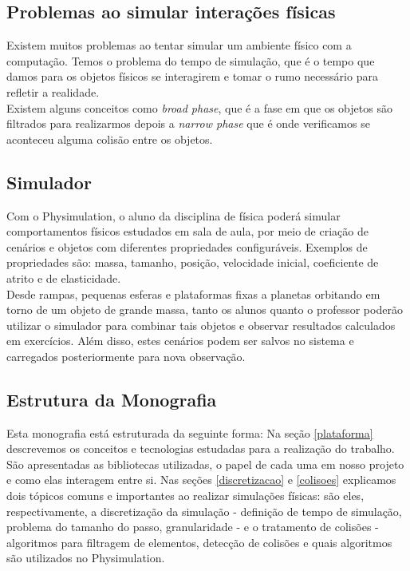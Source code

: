 \subsection{Problemas ao simular interações físicas}
Existem muitos problemas ao tentar simular um ambiente físico com a computação. Temos o problema do tempo de simulação, 
que é o tempo que damos para os objetos físicos se interagirem e tomar o rumo necessário para refletir a realidade. \\

Existem alguns conceitos como \textit{broad phase}, que é a fase em que os objetos são filtrados para realizarmos depois a \textit{narrow phase} que é onde verificamos se aconteceu alguma colisão entre os objetos.

\subsection{Simulador}
Com o Physimulation, o aluno da disciplina de física poderá simular comportamentos físicos estudados em sala de aula, por meio de criação de cenários e objetos com diferentes propriedades configuráveis. Exemplos de propriedades são: massa, tamanho, posição, velocidade inicial, coeficiente de atrito e de elasticidade. \\

Desde rampas, pequenas esferas e plataformas fixas a planetas orbitando em torno de um objeto de grande massa, tanto os alunos quanto o professor poderão utilizar o simulador para combinar tais objetos e observar resultados calculados em exercícios. Além disso, estes cenários podem ser salvos no sistema e carregados posteriormente para nova observação.

\subsection{Estrutura da Monografia}
Esta monografia está estruturada da seguinte forma: Na seção \ref{plataforma} descrevemos os conceitos e tecnologias estudadas para a realização do trabalho. São apresentadas as bibliotecas utilizadas, o papel de cada uma em nosso projeto e como elas interagem entre si. Nas seções \ref{discretizacao} e \ref{colisoes} explicamos dois tópicos comuns e importantes ao realizar simulações físicas: são eles, respectivamente, a discretização da simulação - definição de tempo de simulação, problema do tamanho do passo, granularidade - e o tratamento de colisões - algoritmos para filtragem de elementos, detecção de colisões e quais algoritmos são utilizados no Physimulation.  \\

